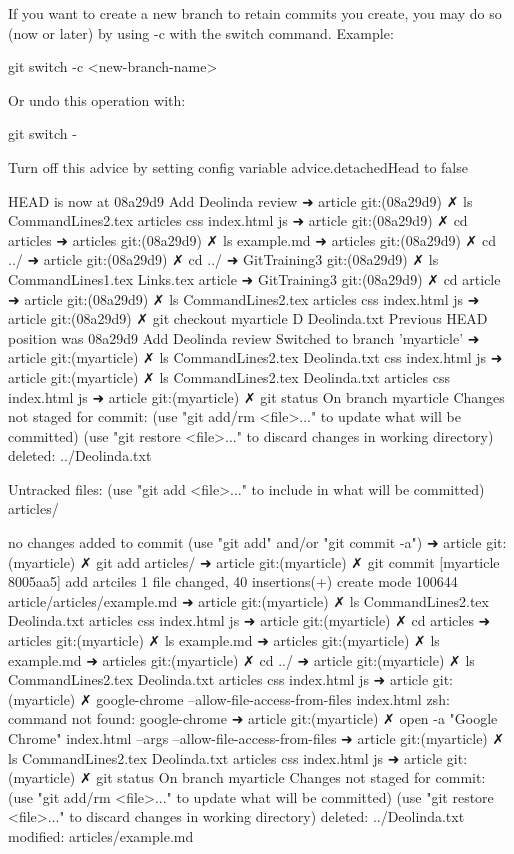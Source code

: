 If you want to create a new branch to retain commits you create, you may
do so (now or later) by using -c with the switch command. Example:

  git switch -c <new-branch-name>

Or undo this operation with:

  git switch -

Turn off this advice by setting config variable advice.detachedHead to false

HEAD is now at 08a29d9 Add Deolinda review
➜  article git:(08a29d9) ✗ ls
CommandLines2.tex articles          css               index.html        js
➜  article git:(08a29d9) ✗ cd articles 
➜  articles git:(08a29d9) ✗ ls
example.md
➜  articles git:(08a29d9) ✗ cd ../
➜  article git:(08a29d9) ✗ cd ../
➜  GitTraining3 git:(08a29d9) ✗ ls
CommandLines1.tex Links.tex         article
➜  GitTraining3 git:(08a29d9) ✗ cd article 
➜  article git:(08a29d9) ✗ ls
CommandLines2.tex articles          css               index.html        js
➜  article git:(08a29d9) ✗ git checkout myarticle
D	Deolinda.txt
Previous HEAD position was 08a29d9 Add Deolinda review
Switched to branch 'myarticle'
➜  article git:(myarticle) ✗ ls
CommandLines2.tex Deolinda.txt      css               index.html        js
➜  article git:(myarticle) ✗ ls
CommandLines2.tex Deolinda.txt      articles          css               index.html        js
➜  article git:(myarticle) ✗ git status
On branch myarticle
Changes not staged for commit:
  (use "git add/rm <file>..." to update what will be committed)
  (use "git restore <file>..." to discard changes in working directory)
	deleted:    ../Deolinda.txt

Untracked files:
  (use "git add <file>..." to include in what will be committed)
	articles/

no changes added to commit (use "git add" and/or "git commit -a")
➜  article git:(myarticle) ✗ git add articles/
➜  article git:(myarticle) ✗ git commit
[myarticle 8005aa5] add artciles
 1 file changed, 40 insertions(+)
 create mode 100644 article/articles/example.md
➜  article git:(myarticle) ✗ ls
CommandLines2.tex Deolinda.txt      articles          css               index.html        js
➜  article git:(myarticle) ✗ cd articles 
➜  articles git:(myarticle) ✗ ls
example.md
➜  articles git:(myarticle) ✗ ls
example.md
➜  articles git:(myarticle) ✗ cd ../
➜  article git:(myarticle) ✗ ls
CommandLines2.tex Deolinda.txt      articles          css               index.html        js
➜  article git:(myarticle) ✗ google-chrome --allow-file-access-from-files index.html
zsh: command not found: google-chrome
➜  article git:(myarticle) ✗ open -a "Google Chrome" index.html --args --allow-file-access-from-files
➜  article git:(myarticle) ✗ ls
CommandLines2.tex Deolinda.txt      articles          css               index.html        js
➜  article git:(myarticle) ✗ git status
On branch myarticle
Changes not staged for commit:
  (use "git add/rm <file>..." to update what will be committed)
  (use "git restore <file>..." to discard changes in working directory)
	deleted:    ../Deolinda.txt
	modified:   articles/example.md

